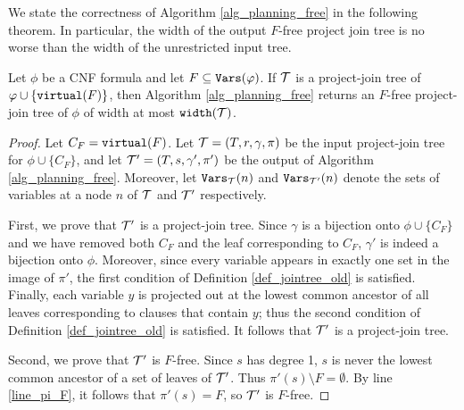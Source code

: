 We state the correctness of Algorithm \ref{alg_planning_free} in the following theorem. In particular, the width of the output $F$-free project join tree is no worse than the width of the unrestricted input tree.
\begin{theorem}\label{thm:planning_free_correctness}
Let $\phi$ be a CNF formula and let $F \subseteq \texttt{\upshape Vars}(\varphi)$. 
If $\mathcal{T}$ is a project-join tree of $\varphi \cup \{\texttt{\upshape virtual}(F)\}$, then Algorithm \ref{alg_planning_free} returns an $F$-free project-join tree of $\phi$ of width at most $\texttt{\upshape width}(\mathcal{T})$.
\end{theorem}
\begin{proof}
Let $C_F = \texttt{\upshape virtual}(F)$.
Let $\mathcal{T} = (T, r, \gamma, \pi)$ be the input project-join tree for $\phi \cup \{ C_F \}$, and let $\mathcal{T}' = (T, s, \gamma', \pi')$ be the output of Algorithm \ref{alg_planning_free}. 
Moreover, let $\texttt{\upshape Vars}_{\mathcal{T}}(n)$ and $\texttt{\upshape Vars}_{\mathcal{T}'}(n)$ denote the sets of variables at a node $n$ of $\mathcal{T}$ and $\mathcal{T}'$ respectively.


First, we prove that $\mathcal{T}'$ is a project-join tree. Since $\gamma$ is a bijection onto $\phi \cup \{C_F\}$ and we have removed both $C_F$ and the leaf corresponding to $C_F$, $\gamma'$ is indeed a bijection onto $\phi$. 
Moreover, since every variable appears in exactly one set in the image of $\pi'$, the first condition of Definition \ref{def_jointree_old} is satisfied. Finally, each variable $y$ is projected out at the lowest common ancestor of all leaves corresponding to clauses that contain $y$; thus the second condition of Definition \ref{def_jointree_old} is satisfied. It follows that $\mathcal{T}'$ is a project-join tree.

Second, we prove that $\mathcal{T}'$ is $F$-free. 
Since $s$ has degree 1, $s$ is never the lowest common ancestor of a set of leaves of $\mathcal{T}'$. Thus $\pi'(s) \setminus F = \emptyset$. By line \ref{line_pi_F}, it follows that $\pi'(s) = F$, so $\mathcal{T}'$ is $F$-free.




\end{proof}
